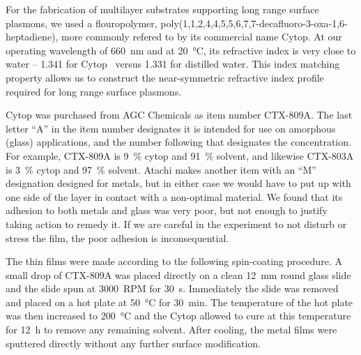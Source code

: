 For the fabrication of multilayer substrates supporting long range surface
plasmons, we used a flouropolymer,
poly(1,1,2,4,4,5,5,6,7,7-decafluoro-3-oxa-1,6-heptadiene), more commonly
refered to by its commercial name Cytop.  At our operating wavelength of
\SI{660}{\nano\meter} and at \SI{20}{\celsius}, its refractive index is
very close to water --
1.341 for Cytop~\cite{mikevs2005synthesis} versus 1.331 for distilled
water.  This index matching property allows us to construct the
near-symmetric refractive index profile required for long range surface
plasmons.

Cytop was purchased from AGC Chemicals as item number CTX-809A.  The last
letter ``A'' in the item number designates it is intended for use on
amorphous (glass) applications, and the number following that designates
the concentration.  For example, CTX-809A is \SI{9}{\percent} cytop and
\SI{91}{\percent} solvent, and likewise CTX-803A is \SI{3}{\percent} cytop
and \SI{97}{\percent} solvent.  Atachi makes another item with an ``M''
designation designed for metals, but in either case we would have to put up
with one side of the layer in contact with a non-optimal material.  We
found that its adhesion to both metals and glass was very poor, but not
enough to justify taking action to remedy it.  If we are careful in the
experiment to not disturb or stress the film, the poor adhesion is
inconsequential.

The thin films were made according to the following spin-coating procedure.
A small drop of CTX-809A was placed directly on a clean
\SI{12}{\milli\meter} round glass slide and the slide spun at
\SI{3000}{RPM} for \SI{30}{\second}.  Immediately the slide was removed and
placed on a hot plate at \SI{50}{\celsius} for \SI{30}{\minute}.  The
temperature of the hot plate was then increased to \SI{200}{\celsius} and
the Cytop allowed to cure at this temperature for \SI{12}{\hour} to remove
any remaining solvent.  After cooling, the metal films were sputtered
directly without any further surface modification.

